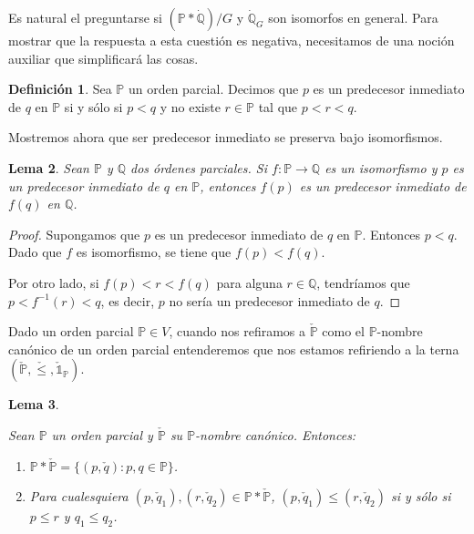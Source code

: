\documentclass[11pt]{unam_tesis1}
\theoremstyle{MyThmStyle}
\theoremstyle{definition}
\newtheorem{definition}{Definici\'on}[chapter]
\theoremstyle{plain}
\newtheorem{lemma}[definition]{Lema}
\theoremstyle{remark}
\let\leq\leqslant
\begin{document}
Es natural el preguntarse si $(\mathbb P *\dot {\mathbb Q})/G$ y $\dot {\mathbb Q}_G$ son isomorfos en general. Para mostrar que la respuesta a esta cuesti\'on es negativa, necesitamos de una noci\'on auxiliar que simplificar\'a las cosas.

\begin{definition}
Sea $\mathbb P$ un orden parcial. Decimos que $p$ es un predecesor inmediato de $q$ en $\mathbb P$ si y s\'olo si $p<q$ y no existe $r\in \mathbb P$ tal que $p<r<q$.
\end{definition}

Mostremos ahora que ser predecesor inmediato se preserva bajo isomorfismos.

\begin{lemma}\label{predecesores}
Sean $\mathbb P$ y $\mathbb Q$ dos \'ordenes parciales. Si $f:\mathbb P\to \mathbb Q$ es un isomorfismo y $p$ es un predecesor inmediato de $q$ en $\mathbb P$, entonces $f(p)$ es un predecesor inmediato de $f(q)$ en $\mathbb Q$.
\end{lemma}

\begin{proof}
Supongamos que $p$ es un predecesor inmediato de $q$ en $\mathbb P$. Entonces $p< q$. Dado que $f$ es isomorfismo, se tiene que $f(p)< f(q)$.

Por otro lado, si $f(p)<r<f(q)$ para alguna $r\in \mathbb Q$, tendr\'iamos que $p<f^{-1}(r)<q$, es decir, $p$ no ser\'ia un predecesor inmediato de $q$. 
\end{proof}

Dado un orden parcial $\mathbb P \in V$, cuando nos refiramos a $\check{\mathbb P}$ como el $\mathbb P$-nombre can\'onico de un orden parcial entenderemos que nos estamos refiriendo a la terna $(\check{\mathbb P}, \check \leq, \check{\mathds 1}_{\mathbb P})$.

\begin{lemma}\label{ordenreducido}

Sean $\mathbb P$ un orden parcial y $\check{\mathbb P}$ su $\mathbb P$-nombre can\'onico. Entonces:

\begin{enumerate}

\item $\mathbb P\ast \check{\mathbb P}=\{(p,\check{q}):p,q\in \mathbb P\}$.
\item Para cualesquiera $(p,\check{q}_1),(r,\check{q}_2)\in \mathbb P*\check{\mathbb P}$, $(p,\check{q}_1)\leq (r,\check{q}_2)$ si y s\'olo si $p\leq r$ y $q_1\leq q_2$.

\end{enumerate}

\end{lemma}
\end{document}
